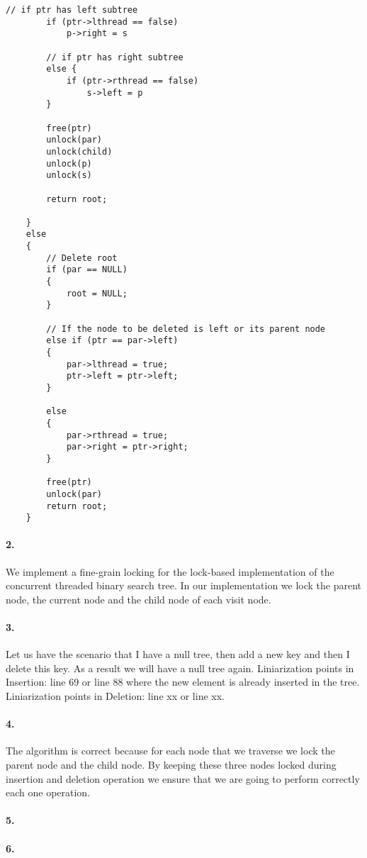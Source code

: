 \begin{lstlisting}[style=mycode]
		// if ptr has left subtree
		if (ptr->lthread == false)
			p->right = s

		// if ptr has right subtree
		else {
			if (ptr->rthread == false)
				s->left = p
		}

		free(ptr)
		unlock(par)
		unlock(child)
		unlock(p)
		unlock(s)

		return root;

	}
	else
	{
		// Delete root 
		if (par == NULL)
		{
			root = NULL;
		}

		// If the node to be deleted is left or its parent node
		else if (ptr == par->left)
		{
			par->lthread = true;
			ptr->left = ptr->left;
		}

		else
		{
			par->rthread = true;
			par->right = ptr->right;
		}

		free(ptr)
		unlock(par)
		return root;
	}

\end{lstlisting}

\paragraph{2.}
We implement a fine-grain locking for the lock-based implementation of
the concurrent threaded binary search tree. In our implementation we
lock the parent node, the current node and the child node of each
visit node.

\paragraph{3.}
Let us have the scenario that I have a null tree, then add a new key
and then I delete this key. As a result we will have a null tree
again.
Liniarization points in Insertion: line 69 or line 88 where the new
element is already inserted in the tree.
Liniarization points in Deletion: line xx or line xx.

\paragraph{4.}
The algorithm is correct because for each node that we traverse we
lock the parent node and the child node. By keeping these three nodes
locked during insertion and deletion operation we ensure that we are
going to perform correctly each one operation.

\paragraph{5.}


\paragraph{6.}

